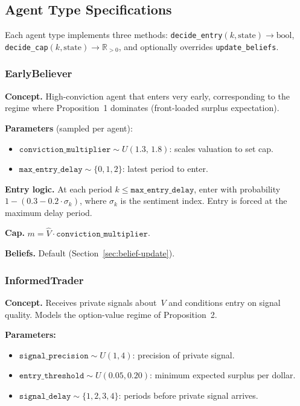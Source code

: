 \documentclass[11pt,a4paper]{article}
\newcommand{\R}{\mathbb{R}}
\begin{document}
\subsection{Agent Type Specifications}
\label{sec:agent-types}

Each agent type implements three methods: \texttt{decide\_entry}$(k, \text{state}) \to \text{bool}$, \texttt{decide\_cap}$(k, \text{state}) \to \R_{>0}$, and optionally overrides \texttt{update\_beliefs}.

\subsubsection{EarlyBeliever}
\label{sec:early-believer}

\textbf{Concept.}  High-conviction agent that enters very early, corresponding to the regime where Proposition~1 dominates (front-loaded surplus expectation).

\textbf{Parameters} (sampled per agent):
\begin{itemize}[nosep]
  \item $\texttt{conviction\_multiplier} \sim U(1.3,\,1.8)$: scales valuation to set cap.
  \item $\texttt{max\_entry\_delay} \sim \{0,1,2\}$: latest period to enter.
\end{itemize}

\textbf{Entry logic.}  At each period $k \leq \texttt{max\_entry\_delay}$, enter with probability $1 - (0.3 - 0.2\cdot\sigma_k)$, where $\sigma_k$ is the sentiment index.  Entry is forced at the maximum delay period.

\textbf{Cap.}  $m = \hat{V}\cdot\texttt{conviction\_multiplier}$.

\textbf{Beliefs.}  Default (Section~\ref{sec:belief-update}).


\subsubsection{InformedTrader}
\label{sec:informed-trader}

\textbf{Concept.}  Receives private signals about~$V$ and conditions entry on signal quality.  Models the option-value regime of Proposition~2.

\textbf{Parameters:}
\begin{itemize}[nosep]
  \item $\texttt{signal\_precision} \sim U(1,4)$: precision of private signal.
  \item $\texttt{entry\_threshold} \sim U(0.05,0.20)$: minimum expected surplus per dollar.
  \item $\texttt{signal\_delay} \sim \{1,2,3,4\}$: periods before private signal arrives.
\end{itemize}
\end{document}
